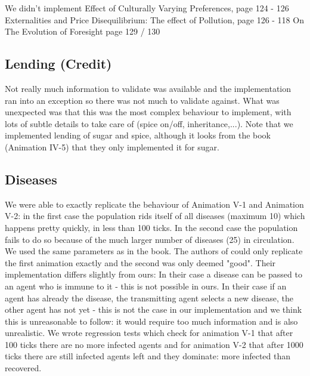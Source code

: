 We didn't implement
Effect of Culturally Varying Preferences, page 124 - 126
Externalities and Price Disequilibrium: The effect of Pollution, page 126 - 118
On The Evolution of Foresight page 129 / 130

\subsection{Lending (Credit)}
Not really much information to validate was available and the \cite{weaver_replicating_nodate} implementation ran into an exception so there was not much to validate against. What was unexpected was that this was the most complex behaviour to implement, with lots of subtle details to take care of (spice on/off, inheritance,...).
Note that we implemented lending of sugar and spice, although it looks from the book (Animation IV-5) that they only implemented it for sugar.

\subsection{Diseases}
We were able to exactly replicate the behaviour of Animation V-1 and Animation V-2: in the first case the population rids itself of all diseases (maximum 10) which happens pretty quickly, in less than 100 ticks. In the second case the population fails to do so because of the much larger number of diseases (25) in circulation. We used the same parameters as in the book. 
The authors of \cite{weaver_replicating_nodate} could only replicate the first animation exactly and the second was only deemed "good". Their implementation differs slightly from ours: In their case a disease can be passed to an agent who is immune to it - this is not possible in ours. In their case if an agent has already the disease, the transmitting agent selects a new disease, the other agent has not yet - this is not the case in our implementation and we think this is unreasonable to follow: it would require too much information and is also unrealistic.
We wrote regression tests which check for animation V-1 that after 100 ticks there are no more infected agents and for animation V-2 that after 1000 ticks there are still infected agents left and they dominate: more infected than recovered.